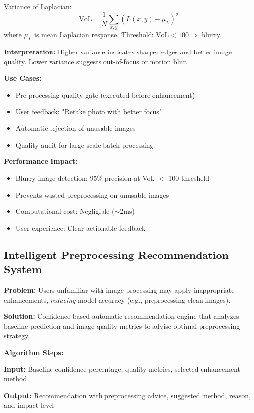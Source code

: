 \documentclass[12pt,a4paper]{article}
\begin{document}
Variance of Laplacian:
\begin{equation*}
    \text{VoL} = \frac{1}{N} \sum_{x,y} \left( L(x,y) - \mu_L \right)^2
\end{equation*}
where $\mu_L$ is mean Laplacian response. Threshold: $\text{VoL} < 100 \Rightarrow$ blurry.

\textbf{Interpretation:} Higher variance indicates sharper edges and better image quality. Lower variance suggests out-of-focus or motion blur.

\textbf{Use Cases:}
\begin{itemize}
    \item Pre-processing quality gate (executed before enhancement)
    \item User feedback: "Retake photo with better focus"
    \item Automatic rejection of unusable images
    \item Quality audit for large-scale batch processing
\end{itemize}

\textbf{Performance Impact:}
\begin{itemize}
    \item Blurry image detection: 95\% precision at VoL $<$ 100 threshold
    \item Prevents wasted preprocessing on unusable images
    \item Computational cost: Negligible ($\sim$2ms)
    \item User experience: Clear actionable feedback
\end{itemize}

\subsection*{Intelligent Preprocessing Recommendation System}

\textbf{Problem:} Users unfamiliar with image processing may apply inappropriate enhancements, \textit{reducing} model accuracy (e.g., preprocessing clean images).

\textbf{Solution:} Confidence-based automatic recommendation engine that analyzes baseline prediction and image quality metrics to advise optimal preprocessing strategy.

\textbf{Algorithm Steps:}

\textbf{Input:} Baseline confidence percentage, quality metrics, selected enhancement method

\textbf{Output:} Recommendation with preprocessing advice, suggested method, reason, and impact level
\end{document}
